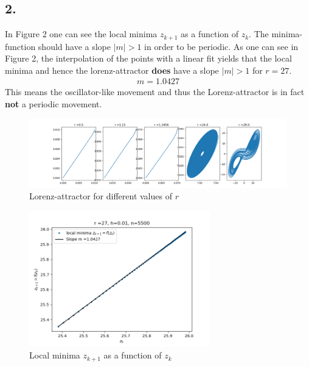 \documentclass[12pt,a4paper]{article}
\begin{document}
\subsection*{2.}
In Figure 2 one can see the local minima $z_{k+1}$ as a function of $z_k$. The minima-function should have a slope $|m|>1$ in order to be periodic. As one can see in Figure 2, the interpolation of the points with a linear fit yields that the local minima and hence the lorenz-attractor \textbf{does} have a slope $|m|>1$ for $r=27$. 
\begin{align*}
	m=1.0427
\end{align*}
This means the oscillator-like movement and thus the Lorenz-attractor is in fact \textbf{not} a periodic movement. 
\begin{figure}[h]
\centering
	\includegraphics[width=1\textwidth]{lorenz.png}
	\caption{Lorenz-attractor for different values of $r$}
\end{figure}
\begin{figure}[h]
\centering
\includegraphics[width=0.7\textwidth]{lorenzz.png}
\caption{Local minima $z_{k+1}$ as a function of $z_k$}
\end{figure}
\end{document}
